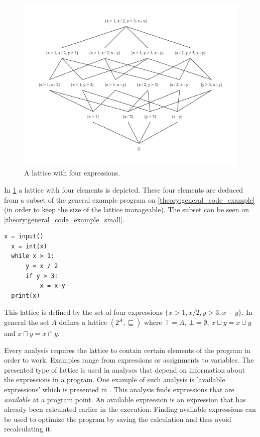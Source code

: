 \begin{figure}
\begin{center}
\includegraphics[width=\textwidth]{figures/dot_files/lattice_example.pdf}
\end{center}
\caption{A lattice with four expressions.}
\label{lattice_example}
\end{figure}

In \cref{lattice_example} a lattice with four elements is depicted.
These four elements are deduced from a subset of the general example program on \cref{theory:general_code_example} (in order to keep the size of the lattice manageable).
The subset can be seen on \cref{theory:general_code_example_small}.

\begin{lstlisting}[style=python, caption={The general code example used throughout the theory chapter}, label={theory:general_code_example_small}]
  x = input()
  x = int(x)
  while x > 1:
      y = x / 2
      if y > 3:
          x = x-y
  print(x)
\end{lstlisting}

This lattice is defined by the set of four expressions $\{x > 1, x / 2, y > 3, x - y \}$.
In general the set $A$ defines a lattice $(2^A, \sqsubseteq )$ where $\top = A$, $\bot = \emptyset$, $x\sqcup y = x \cup y$ and $x \sqcap y = x \cap y$.

Every analysis requires the lattice to contain certain elements of the program in order to work.
Examples range from expressions or assignments to variables.
The presented type of lattice is used in analyses that depend on information about the expressions in a program.
One example of such analysis is 'available expressions' which is presented in \citet[p.~22]{schwartzbach}.
This analysis finds expressions that are \emph{available} at a program point.
An available expression is an expression that has already been calculated earlier in the execution.
Finding available expressions can be used to optimize the program by saving the calculation and thus avoid recalculating it.



